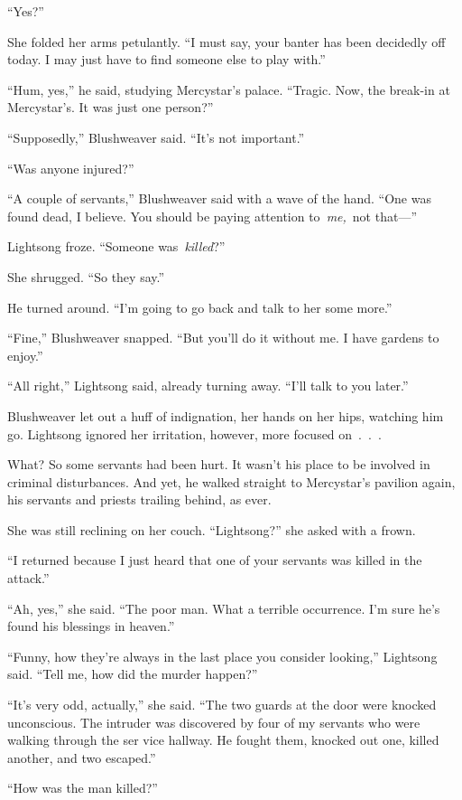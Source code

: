 “Yes?”

She folded her arms petulantly. “I must say, your banter has been decidedly off today. I may just have to find someone else to play with.”

“Hum, yes,” he said, studying Mercystar’s palace. “Tragic. Now, the break-in at Mercystar’s. It was just one person?”

“Supposedly,” Blushweaver said. “It’s not important.”

“Was anyone injured?”

“A couple of servants,” Blushweaver said with a wave of the hand. “One was found dead, I believe. You should be paying attention to~\textit{me,}~not that—”

Lightsong froze. “Someone was~\textit{killed}?”

She shrugged. “So they say.”

He turned around. “I’m going to go back and talk to her some more.”

“Fine,” Blushweaver snapped. “But you’ll do it without me. I have gardens to enjoy.”

“All right,” Lightsong said, already turning away. “I’ll talk to you later.”

Blushweaver let out a huff of indignation, her hands on her hips, watching him go. Lightsong ignored her irritation, however, more focused on~.~.~.

What? So some servants had been hurt. It wasn’t his place to be involved in criminal disturbances. And yet, he walked straight to Mercystar’s pavilion again, his servants and priests trailing behind, as ever.

She was still reclining on her couch. “Lightsong?” she asked with a frown.

“I returned because I just heard that one of your servants was killed in the attack.”

“Ah, yes,” she said. “The poor man. What a terrible occurrence. I’m sure he’s found his blessings in heaven.”

“Funny, how they’re always in the last place you consider looking,” Lightsong said. “Tell me, how did the murder happen?”

“It’s very odd, actually,” she said. “The two guards at the door were knocked unconscious. The intruder was discovered by four of my servants who were walking through the ser vice hallway. He fought them, knocked out one, killed another, and two escaped.”

“How was the man killed?”

